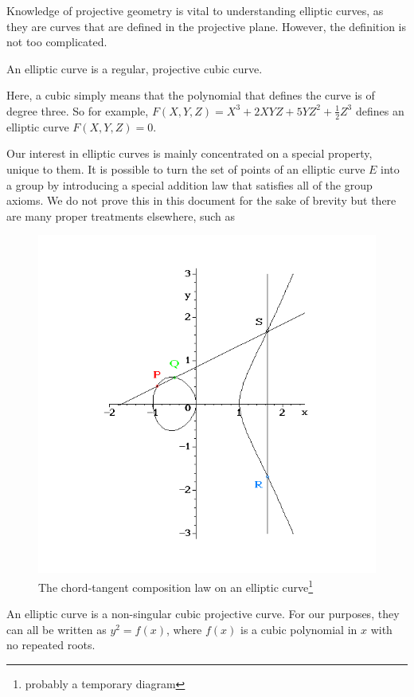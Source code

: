 Knowledge of projective geometry is vital to understanding elliptic curves, as they are curves that are defined in the projective plane.
However, the definition is not too complicated.
\begin{definition}
	An elliptic curve is a regular, projective cubic curve.
\end{definition}
Here, a cubic simply means that the polynomial that defines the curve is of degree three.
So for example, $F(X,Y,Z) = X^3 + 2XYZ + 5YZ^2 + \frac{1}{2}Z^3$ defines an elliptic curve $F(X,Y,Z) = 0$. %

Our interest in elliptic curves is mainly concentrated on a special property, unique to them.
It is possible to turn the set of points of an elliptic curve $E$ into a group by introducing a special addition law that satisfies all of the group axioms.
We do not prove this in this document for the sake of brevity but there are many proper treatments elsewhere, such as 
\begin{figure}[htpb]
	\centering
	\includegraphics[scale=0.5]{addition.png}
	\caption{The chord-tangent composition law on an elliptic curve\footnote{probably a temporary diagram}}
	\label{chord-tangent}
\end{figure}

\begin{definition}
	An elliptic curve is a non-singular cubic projective curve. For our purposes, they can all be written as $y^2 = f(x)$, where $f(x)$ is a cubic polynomial in $x$ with no repeated roots.
\end{definition}
